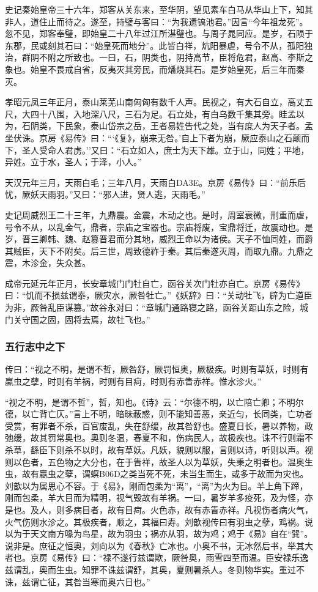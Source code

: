 \documentclass[]{article}
\begin{document}
史记秦始皇帝三十六年，郑客从关东来，至华阴，望见素车白马从华山上下，知其非人，道住止而待之。遂至，持璧与客曰：``为我遗镐池君。''因言``今年祖龙死''。忽不见，郑客奉璧，即始皇二十八年过江所湛璧也。与周子晁同应。是岁，石陨于东郡，民或刻其石曰：``始皇死而地分''。此皆白祥，炕阳暴虐，号令不从，孤阳独治，群阴不附之所致也。一曰，石，阴类也，阴持高节，臣将危君，赵高、李斯之象也。始皇不畏戒自省，反夷灭其旁民，而燔烧其石。是岁始皇死，后三年而秦灭。

孝昭元凤三年正月，泰山莱芜山南匈匈有数千人声。民视之，有大石自立，高丈五尺，大四十八围，入地深八尺，三石为足。石立处，有白乌数千集其旁。眭孟以为，石阴类，下民象，泰山岱宗之岳，王者易姓告代之处，当有庶人为天子者。孟坐伏诛。京房《易传》曰：```《复》，崩来无咎。'自上下者为崩，厥应泰山之石颠而下，圣人受命人君虏。''又曰：``石立如人，庶士为天下雄。立于山，同姓；平地，异姓。立于水，圣人；于泽，小人。''

天汉元年三月，天雨白毛；三年八月，天雨白DA3E。京房《易传》曰：``前乐后忧，厥妖天雨羽。''又曰：``邪人进，贤人逃，天雨毛。''

史记周威烈王二十三年，九鼎震。金震，木动之也。是时，周室衰微，刑重而虐，号令不从，以乱金气，鼎者，宗庙之宝器也。宗庙将废，宝鼎将迁，故震动也。是岁，晋三卿韩、魏、赵篡晋君而分其地，威烈王命以为诸侯。天子不恤同姓，而爵其贼臣，天下不附矣。后三世，周致德祚于秦。其后秦遂灭周，而取九鼎。九鼎之震，木沴金，失众甚。

成帝元延元年正月，长安章城门门牡自亡，函谷关次门牡亦自亡。京房《易传》曰：``饥而不损兹谓泰，厥灾水，厥咎牡亡。''《妖辞》曰：``关动牡飞，辟为亡道臣为非，厥咎乱臣谋篡。''故谷永对曰：``章城门通路寝之路，函谷关距山东之险，城门关守国之固，固将去焉，故牡飞也。''

\hypertarget{header-n2245}{%
\subsubsection{五行志中之下}\label{header-n2245}}

传曰：``视之不明，是谓不哲，厥咎舒，厥罚恒奥，厥极疾。时则有草妖，时则有蠃虫之孽，时则有羊祸，时则有目疴，时则有赤眚赤祥。惟水沴火。''

``视之不明，是谓不哲''，哲，知也。《诗》云：``尔德不明，以亡陪亡卿；不明尔德，以亡背亡仄。''言上不明，暗昧蔽惑，则不能知善恶，亲近匀，长同类，亡功者受赏，有罪者不杀，百官废乱，失在舒缓，故其咎舒也。盛夏日长，暑以养物，政弛缓，故其罚常奥也。奥则冬温，春夏不和，伤病民人，故极疾也。诛不行则霜不杀草，繇臣下则杀不以时，故有草妖。凡妖，貌则以服，言则以诗，听则以声。视则以色者，五色物之大分也，在于眚祥，故圣人以为草妖，失秉之明者也。温奥生虫，故有蠃虫之孽，谓螟B06D之类当死不死，未当生而生，或多于故而为灾也。刘歆以为属思心不容。于《易》，刚而包柔为``离''，``离''为火为目。羊上角下蹄，刚而包柔，羊大目而为精明，视气毁故有羊祸。一曰，暑岁羊多疫死，及为怪，亦是也。及人，则多病目者，故有目疴。火色赤，故有赤眚赤祥。凡视伤者病火气，火气伤则水沴之。其极疾者，顺之，其福曰寿。刘歆视传曰有羽虫之孽，鸡祸。说以为于天文南方喙为鸟星，故为羽虫；祸亦从羽，故为鸡；鸡于《易》自在``巽''。说非是。庶征之恒奥，刘向以为《春秋》亡冰也。小奥不书，无冰然后书，举其大者也。京房《易传》曰：``禄不遂行兹谓欺，厥咎奥，雨雪四至而温。臣安禄乐逸兹谓乱，奥而生虫。知罪不诛兹谓舒，其奥，夏则暑杀人。冬则物华实。重过不诛，兹谓亡征，其咎当寒而奥六日也。''
\end{document}
